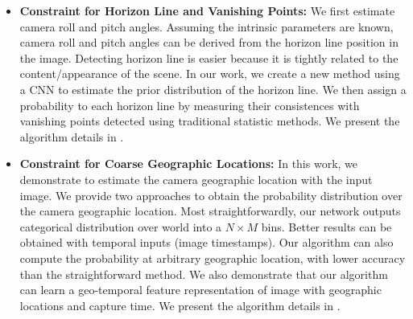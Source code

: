 \begin{itemize}[noitemsep]
  \item \textbf{Constraint for Horizon Line and Vanishing Points:}
  We first estimate camera roll and pitch angles. Assuming the intrinsic
  parameters are known, camera roll and pitch angles can be
  derived from the horizon line position in the image. Detecting horizon
  line is easier because it is tightly related to the content/appearance
  of the scene. In our work, we create a new method using a CNN to
  estimate the prior distribution of the horizon line. We then assign
  a probability to each horizon line by measuring their consistences
  with vanishing points detected using traditional statistic methods.
  We present the algorithm details in .
  \newline

  \item \textbf{Constraint for Coarse Geographic Locations:}
  In this work, we demonstrate to estimate the camera geographic
  location with the input image.
  We provide two approaches to obtain the probability distribution over the camera
  geographic location. Most straightforwardly, our network outputs
  categorical distribution over world into a $N \times M$ bins. Better
  results can be obtained with temporal inputs (image timestamps).
  Our algorithm can also compute the probability at arbitrary
  geographic location, with lower accuracy than the straightforward
  method.
  We also demonstrate that our algorithm can learn a  geo-temporal
  feature representation of image with geographic locations and capture
  time.
  We present the algorithm details in .
  \newline


\end{itemize}
